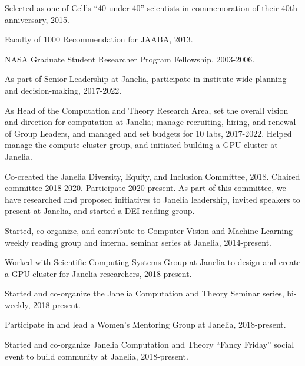 \documentclass[11pt, letterpaper]{awesome-cv}
\begin{document}
\vspace{\acvSectionContentTopSkip}
\vspace{2mm}
\begin{cvitems}
\item Selected as one of Cell’s ``40 under 40'' scientists in commemoration of their 40th anniversary, 2015.
\item Faculty of 1000 Recommendation for JAABA, 2013.
\item NASA Graduate Student Researcher Program Fellowship, 2003-2006.
\end{cvitems}
\vspace{\acvSectionContentTopSkip}

\vspace{\acvSectionContentTopSkip}
\vspace{2mm}
\begin{cvitems}
\item As part of Senior Leadership at Janelia, participate in institute-wide planning and decision-making, 2017-2022.
\item As Head of the Computation and Theory Research Area, set the overall vision and direction for computation at Janelia; manage recruiting, hiring, and renewal of Group Leaders, and managed and set budgets for 10 labs, 2017-2022. Helped manage the compute cluster group, and initiated building a GPU cluster at Janelia. 
\item Co-created the Janelia Diversity, Equity, and Inclusion Committee, 2018. Chaired committee 2018-2020. Participate 2020-present. As part of this committee, we have researched and proposed initiatives to Janelia leadership, invited speakers to present at Janelia, and started a DEI reading group.
\item Started, co-organize, and contribute to Computer Vision and Machine Learning weekly reading group and internal seminar series at Janelia, 2014-present.
\item Worked with Scientific Computing Systems Group at Janelia to design and create a GPU cluster for Janelia researchers, 2018-present.
\item Started and co-organize the Janelia Computation and Theory Seminar series, bi-weekly, 2018-present. 
\item Participate in and lead a Women's Mentoring Group at Janelia, 2018-present.
\item Started and co-organize Janelia Computation and Theory ``Fancy Friday'' social event to build community at Janelia, 2018-present. 
\end{cvitems}
\vspace{\acvSectionContentTopSkip}
\end{document}
